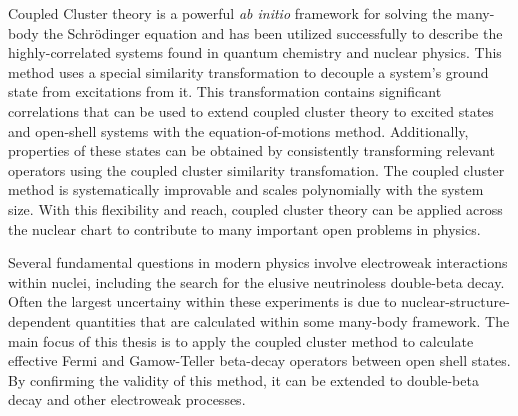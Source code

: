 \documentclass[../thesis.tex]{subfiles}
\begin{document}
Coupled Cluster theory is a powerful \emph{ab initio} framework for solving the many-body the Schr\"{o}dinger equation and has been utilized successfully to describe the highly-correlated systems found in quantum chemistry and nuclear physics.  This method uses a special similarity transformation to decouple a system's ground state from excitations from it.  This transformation contains significant correlations that can be used to extend coupled cluster theory to excited states and open-shell systems with the equation-of-motions method.  Additionally, properties of these states can be obtained by consistently transforming relevant operators using the coupled cluster similarity transfomation.  The coupled cluster method is systematically improvable and scales polynomially with the system size.  With this flexibility and reach, coupled cluster theory can be applied across the nuclear chart to contribute to many important open problems in physics.

Several fundamental questions in modern physics involve electroweak interactions within nuclei, including the search for the elusive neutrinoless double-beta decay.  Often the largest uncertainy within these experiments is due to nuclear-structure-dependent quantities that are calculated within some many-body framework.  The main focus of this thesis is to apply the coupled cluster method to calculate effective Fermi and Gamow-Teller beta-decay operators between open shell states.  By confirming the validity of this method, it can be extended to double-beta decay and other electroweak processes.
\end{document}
